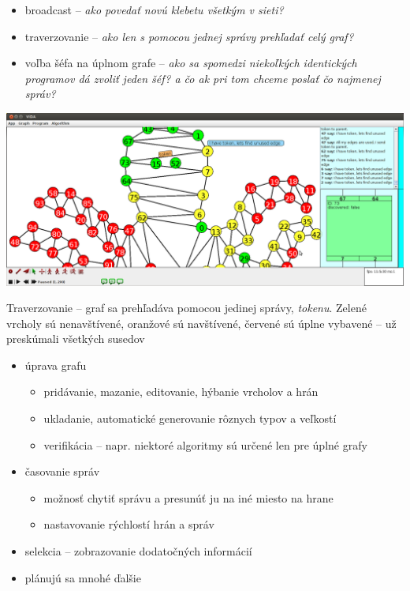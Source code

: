 
\begin{itemize}

    \item broadcast -- \textit{ako povedať novú klebetu všetkým v sieti?}
    \item traverzovanie -- \textit{ako len s pomocou jednej správy prehľadať celý graf?}
    \item voľba šéfa na úplnom grafe -- \textit{ako sa spomedzi niekoľkých identických programov
    dá zvoliť jeden šéf? a čo ak pri tom chceme poslať čo najmenej správ?}

\end{itemize}

\includegraphics[width=\columnwidth]{traverz}
\caption{Traverzovanie -- graf sa prehľadáva pomocou jedinej správy, \emph{tokenu}. Zelené vrcholy
sú nenavštívené, oranžové sú navštívené, červené sú úplne vybavené -- už preskúmali všetkých susedov}

    

\begin{itemize}
    \item úprava grafu
    \begin{itemize}
        \item pridávanie, mazanie, editovanie, hýbanie vrcholov a hrán
        \item ukladanie, automatické generovanie rôznych typov a veľkostí
        \item verifikácia -- napr. niektoré algoritmy sú určené len pre úplné grafy
    \end{itemize}
    \item časovanie správ
    \begin{itemize}
        \item možnosť chytiť správu a presunúť ju na iné miesto na hrane
        \item nastavovanie rýchlostí hrán a správ
    \end{itemize}
    \item selekcia -- zobrazovanie dodatočných informácií
    \item plánujú sa mnohé ďalšie


\end{itemize}


